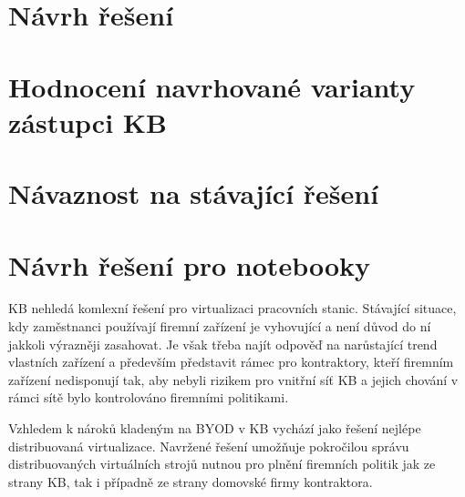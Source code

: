 


\section{Návrh řešení}



\section{Hodnocení navrhované varianty zástupci KB}




\section{Návaznost na stávající řešení}



\section{Návrh řešení pro notebooky}

KB nehledá komlexní řešení pro virtualizaci pracovních stanic. Stávající situace, kdy zaměstnanci používají firemní zařízení je vyhovující a není důvod do ní jakkoli výrazněji zasahovat. Je však třeba najít odpověď na narůstající trend vlastních zařízení a především představit rámec pro kontraktory, kteří firemním zařízení nedisponují tak, aby nebyli rizikem pro vnitřní síť KB a jejich chování v rámci sítě bylo kontrolováno firemními politikami.


Vzhledem k nároků kladeným na BYOD v KB vychází jako řešení nejlépe distribuovaná virtualizace. Navržené řešení umožňuje pokročilou správu distribuovaných virtuálních strojů nutnou pro plnění firemních politik jak ze strany KB, tak i případně ze strany domovské firmy kontraktora.

